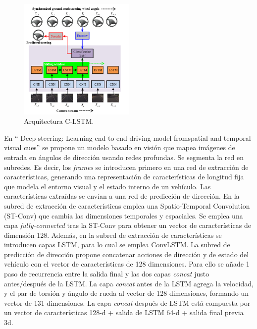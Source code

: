 \begin{figure}
\begin{center}
	\includegraphics[width=0.5\textwidth]{figures/Estado_arte/clstm.png}
   \caption{Arquitectura C-LSTM.}
	\label{fig.clstm}
\end{center}
\end{figure}

En `` Deep  steering:  Learning  end-to-end  driving  model  fromspatial and temporal visual cues'' \cite{deep-steering} se propone un modelo basado en visión que mapea imágenes de entrada en ángulos de dirección usando redes profundas. Se segmenta la red en subredes. Es decir, los \textit{frames} se introducen primero en una red de extracción de características, generando una representación de características de longitud fija que modela el entorno visual y el estado interno de un vehículo. Las características extraídas se envían a una red de predicción de dirección. En la subred de extracción de características emplea una Spatio-Temporal Convolution (ST-Conv) que cambia las dimensiones temporales y espaciales. Se emplea una capa \textit{fully-connected} tras la ST-Conv para obtener un vector de características de dimensión 128. Además, en la subred de extracción de características se introducen capas LSTM, para lo cual se emplea ConvLSTM. La subred de predicción de dirección propone concatenar acciones de dirección y de estado del vehículo con el vector de características de 128 dimensiones. Para ello se añade 1 paso de recurrencia entre la salida final y las dos capas \textit{concat} justo antes/después de la LSTM. La capa \textit{concat} antes de la LSTM agrega la velocidad, y el par de torsión y ángulo de rueda al vector de 128 dimensiones, formando un vector de 131 dimensiones. La capa \textit{concat} después de LSTM está compuesta por un vector de características 128-d + salida de LSTM 64-d + salida final previa 3d.\\

